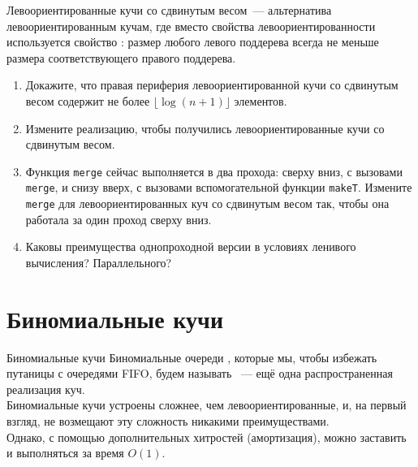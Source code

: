 \begin{frame}[fragile]{}
\begin{exercise}\label{ex:3.4}
  Левоориентированные кучи
  со сдвинутым весом~--- альтернатива левоориентированным кучам, где
  вместо свойства левоориентированности используется свойство
  : размер любого левого поддерева всегда не меньше размера
  соответствующего правого поддерева.
  \begin{enumerate}
    \item Докажите, что правая периферия левоориентированной кучи со
    сдвинутым весом содержит не более $\lfloor \log(n+1) \rfloor$ элементов.
    \item Измените реализацию, чтобы получились
    левоориентированные кучи со сдвинутым весом.
    \item Функция \lstinline!merge! сейчас выполняется в два прохода:
    сверху вниз, с вызовами \lstinline!merge!, и снизу вверх, с
    вызовами вспомогательной функции \lstinline!makeT!. Измените
    \lstinline!merge! для левоориентированных куч со сдвинутым весом
    так, чтобы она работала за один проход сверху вниз.
    \item Каковы преимущества однопроходной версии в
    условиях ленивого вычисления? Параллельного?
  \end{enumerate}
\end{exercise}
\end{frame}
\fi 


\section{Биномиальные кучи}
\label{sc:3.2}

\begin{frame}{Биномиальные кучи}
Биномиальные очереди \cite{Vuillemin1978, Brown1978}, которые мы,
чтобы избежать путаницы с очередями FIFO, будем называть ~--- ещё одна распространенная реализация
куч. \\

Биномиальные кучи устроены сложнее, чем левоориентированные, и, на
первый взгляд, не возмещают эту сложность никакими
преимуществами. \\

Однако, с помощью дополнительных хитростей (амортизация\cite{sc:5.3}), можно заставить  и
 выполняться за время $O(1)$.

\end{frame}

